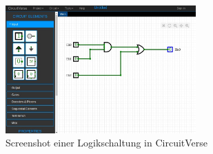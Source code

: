 \begin{figure}[H]
	\begin{center}
		\includegraphics[width=0.65\textwidth ,clip]{./images/circuitverse.jpg}
		\caption{Screenshot einer Logikschaltung in CircuitVerse}
		\label{img:circuitVerseBasic}
	\end{center} 
\end{figure}	

